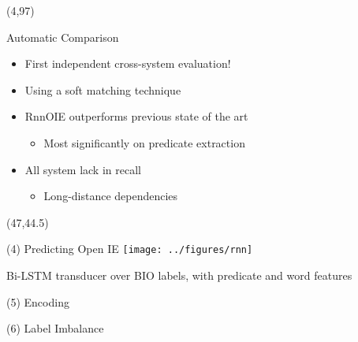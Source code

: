 \documentclass[final]{beamer}
\newcommand{\commonvspace}[0]{\vspace{1cm}}
\begin{document}
\begin{frame}{}
\begin{textblock}{39}
\end{textblock}

\begin{textblock}{82}(4,97)

\begin{block}{Automatic Comparison}
  \noindent
  \begin{minipage}{.35\textwidth}
  \begin{itemize}
    \setlength\itemsep{1em}
  \item \alert{First independent cross-system evaluation!}
  \item Using a soft matching technique
  \item RnnOIE outperforms previous state of the art
    \begin{itemize}
    \item Most significantly on \alert{predicate extraction}
    \end{itemize}
  \item All system lack in recall
    \begin{itemize}
      \item Long-distance dependencies
    \end{itemize}
  \end{itemize}
  \end{minipage}%
  \begin{minipage}{.65\textwidth}
    
    \end{minipage}
\end{block}

\end{textblock}



\begin{textblock}{39}(47,44.5) 
  \begin{block}{(4) Predicting Open IE}
    \center
    \texttt{[image: ../figures/rnn]}

    Bi-LSTM transducer over BIO labels, with predicate and word features
  \end{block}
  \commonvspace

  \begin{block}{(5) Encoding}
    \vspace{-2cm}
    
  \end{block}
  \commonvspace

  \begin{block}{(6) Label Imbalance}


\end{block}
\end{textblock}
\end{frame}
\end{document}
